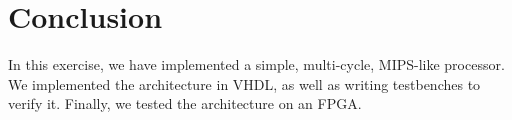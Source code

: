 \chapter{Conclusion}

In this exercise, we have implemented a simple, multi-cycle, MIPS-like processor.
We implemented the architecture in VHDL, as well as writing testbenches to verify it.
Finally, we tested the architecture on an FPGA.
